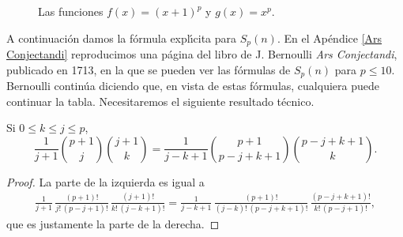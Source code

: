 \begin{figure}
\begin{center}
\end{center}
\caption{\label{funciones} Las funciones $f(x)=(x+1)^p$ y $g(x)=x^p$.}
\end{figure}

A continuaci\'on damos la f\'ormula expl\'\i cita para $S_p(n)$. En el Ap\'endice \ref{Ars Conjectandi} reproducimos una p\'agina del libro de J. Bernoulli \emph{Ars Conjectandi}, publicado en 1713, en la que se pueden ver las f\'ormulas de $S_p(n)$ para $p\leq 10$. Bernoulli contin\'ua diciendo que, en vista de estas f\'ormulas, cualquiera puede continuar la tabla. Necesitaremos el siguiente resultado t\'ecnico.

\begin{lemma} Si $0\leq k\leq j\leq p$,
$$\frac{1}{j+1}{p+1\choose j}{j+1\choose k}=\frac{1}{j-k+1}{p+1\choose p-j+k+1}{p-j+k+1\choose k}.$$\end{lemma}

\begin{proof}
La parte de la izquierda es igual a
\begin{eqnarray*}&\frac{1}{j+1}\,\frac{(p+1)!}{j!\,(p-j+1)!}\,\frac{(j+1)!}{k!\,(j-k+1)!}
=\frac{1}{j-k+1}\,\frac{(p+1)!}{(j-k)!\,(p-j+k+1)!}\,\frac{(p-j+k+1)!}{k!\,(p-j+1)!},&
\end{eqnarray*}
que es justamente la parte de la derecha.
\end{proof}

